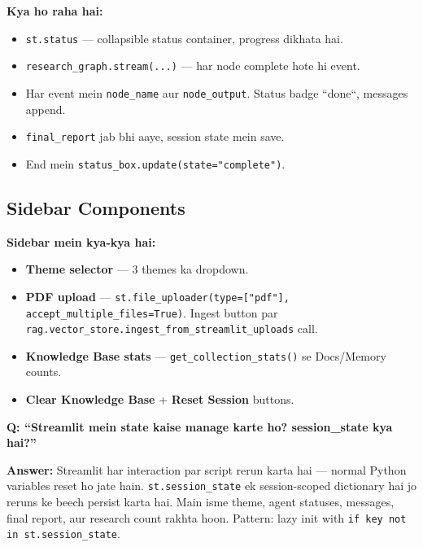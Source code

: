 \documentclass[11pt, a4paper]{article}
\begin{document}
\begin{codestorybox}
\textbf{Kya ho raha hai:}
\begin{itemize}
\item \texttt{st.status} --- collapsible status container, progress dikhata hai.
\item \texttt{research\_graph.stream(...)} --- har node complete hote hi event.
\item Har event mein \texttt{node\_name} aur \texttt{node\_output}. Status badge ``done``, messages append.
\item \texttt{final\_report} jab bhi aaye, session state mein save.
\item End mein \texttt{status\_box.update(state="complete")}.
\end{itemize}
\end{codestorybox}

\subsection{Sidebar Components}

\begin{conceptbox}
\textbf{Sidebar mein kya-kya hai:}
\begin{itemize}
\item \textbf{Theme selector} --- 3 themes ka dropdown.
\item \textbf{PDF upload} --- \texttt{st.file\_uploader(type=["pdf"], accept\_multiple\_files=True)}. Ingest button par \texttt{rag.vector\_store.ingest\_from\_streamlit\_uploads} call.
\item \textbf{Knowledge Base stats} --- \texttt{get\_collection\_stats()} se Docs/Memory counts.
\item \textbf{Clear Knowledge Base} + \textbf{Reset Session} buttons.
\end{itemize}
\end{conceptbox}

\begin{interviewbox}
\textbf{Q: ``Streamlit mein state kaise manage karte ho? session\_state kya hai?''}

\textbf{Answer:} Streamlit har interaction par script rerun karta hai --- normal Python variables reset ho jate hain. \texttt{st.session\_state} ek session-scoped dictionary hai jo reruns ke beech persist karta hai. Main isme theme, agent statuses, messages, final report, aur research count rakhta hoon. Pattern: lazy init with \texttt{if key not in st.session\_state}.
\end{interviewbox}
\end{document}

